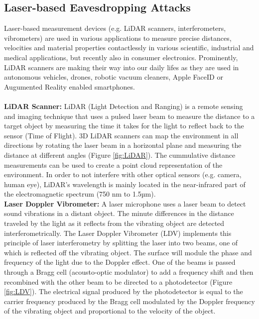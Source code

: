 \documentclass[sigconf, nonacm]{acmart}
\begin{document}
\subsection{Laser-based Eavesdropping Attacks}

Laser-based measurement devices (e.g. LiDAR scanners, interferometers, vibrometers) are used in various applications to measure precise distances, velocities and material properties contactlessly in various scientific, industrial and medical applications, but recently also in consumer electronics.
Prominently, LiDAR scanners are making their way into our daily lifes as they are used in autonomous vehicles, drones, robotic vacuum cleaners, Apple FaceID or Augumented Reality enabled smartphones.
\\~\\
\textbf{LiDAR Scanner:} LiDAR (Light Detection and Ranging) is a remote sensing and imaging technique that uses a pulsed laser beam to measure the distance to a target object by measuring the time it takes for the light to reflect back to the sensor (Time of Flight).
3D LiDAR scanners can map the environment in all directions by rotating the laser beam in a horizontal plane and measuring the distance at different angles (Figure \ref{fig:LiDAR}).
The cummulative distance measurements can be used to create a point cloud representation of the environment.
In order to not interfere with other optical sensors (e.g. camera, human eye), LiDAR's wavelength is mainly located in the near-infrared part of the electromagnetic spectrum (750 nm to 1.5µm).
\\[6pt]
\textbf{Laser Doppler Vibrometer:} A laser microphone uses a laser beam to detect sound vibrations in a distant object. The minute differences in the distance traveled by the light as it reflects from the vibrating object are detected interferometrically. The Laser Doppler Vibrometer (LDV) implements this principle of laser interferometry by splitting the laser into two beams, one of which is reflected off the vibrating object. The surface will module the phase and frequency of the light due to the Doppler effect. One of the beams is passed through a Bragg cell (acousto-optic modulator) to add a frequency shift and then recombined with the other beam to be directed to a photodetector (Figure \ref{fig:LDV}). The electrical signal produced by the photodetector is equal to the carrier frequency produced by the Bragg cell modulated by the Doppler frequency of the vibrating object and proportional to the velocity of the object.
\end{document}
